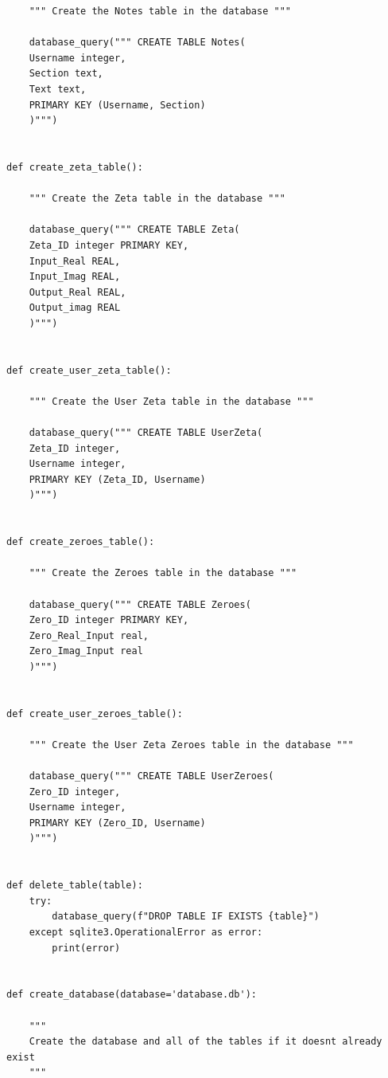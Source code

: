 \documentclass{article}
\begin{document}
\begin{lstlisting}
    """ Create the Notes table in the database """

    database_query(""" CREATE TABLE Notes(
    Username integer,
    Section text,
    Text text,
    PRIMARY KEY (Username, Section)
    )""")


def create_zeta_table():

    """ Create the Zeta table in the database """

    database_query(""" CREATE TABLE Zeta(
    Zeta_ID integer PRIMARY KEY,
    Input_Real REAL,
    Input_Imag REAL,
    Output_Real REAL,
    Output_imag REAL
    )""")


def create_user_zeta_table():

    """ Create the User Zeta table in the database """

    database_query(""" CREATE TABLE UserZeta(
    Zeta_ID integer,
    Username integer,
    PRIMARY KEY (Zeta_ID, Username)
    )""")


def create_zeroes_table():

    """ Create the Zeroes table in the database """

    database_query(""" CREATE TABLE Zeroes(
    Zero_ID integer PRIMARY KEY,
    Zero_Real_Input real,
    Zero_Imag_Input real
    )""")


def create_user_zeroes_table():

    """ Create the User Zeta Zeroes table in the database """

    database_query(""" CREATE TABLE UserZeroes(
    Zero_ID integer,
    Username integer,
    PRIMARY KEY (Zero_ID, Username)
    )""")


def delete_table(table):
    try:
        database_query(f"DROP TABLE IF EXISTS {table}")
    except sqlite3.OperationalError as error:
        print(error)


def create_database(database='database.db'):

    """
    Create the database and all of the tables if it doesnt already exist
    """


\end{lstlisting}
\end{document}
